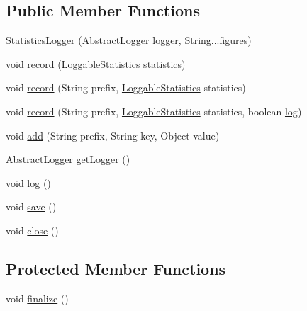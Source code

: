 \subsection*{Public Member Functions}
\begin{DoxyCompactItemize}
\item 
\hyperlink{classjenes_1_1statistics_1_1_statistics_logger_ad4bf879bdfb673a6f82f3536fd5557b8}{Statistics\-Logger} (\hyperlink{classjenes_1_1utils_1_1_abstract_logger}{Abstract\-Logger} \hyperlink{classjenes_1_1statistics_1_1_statistics_logger_a8b3fff50891ab6715773b1e71dbfe30d}{logger}, String...\-figures)
\item 
void \hyperlink{classjenes_1_1statistics_1_1_statistics_logger_a8f7fc89cbbd6c6aad447057cd3eb6dbe}{record} (\hyperlink{classjenes_1_1statistics_1_1_statistics_logger_1_1_loggable_statistics}{Loggable\-Statistics} statistics)
\item 
void \hyperlink{classjenes_1_1statistics_1_1_statistics_logger_a31acd1617a14ed32519fc5487b30fd25}{record} (String prefix, \hyperlink{classjenes_1_1statistics_1_1_statistics_logger_1_1_loggable_statistics}{Loggable\-Statistics} statistics)
\item 
void \hyperlink{classjenes_1_1statistics_1_1_statistics_logger_a1e68400e5e02df74005d654dd52a9b34}{record} (String prefix, \hyperlink{classjenes_1_1statistics_1_1_statistics_logger_1_1_loggable_statistics}{Loggable\-Statistics} statistics, boolean \hyperlink{classjenes_1_1statistics_1_1_statistics_logger_a35539d6c4f5664617185d68c6efdf66a}{log})
\item 
void \hyperlink{classjenes_1_1statistics_1_1_statistics_logger_ac9ee13346b299296f315ad6cf247fdcf}{add} (String prefix, String key, Object value)
\item 
\hyperlink{classjenes_1_1utils_1_1_abstract_logger}{Abstract\-Logger} \hyperlink{classjenes_1_1statistics_1_1_statistics_logger_abd8fdfad668108933aa315c415050d63}{get\-Logger} ()
\item 
void \hyperlink{classjenes_1_1statistics_1_1_statistics_logger_a35539d6c4f5664617185d68c6efdf66a}{log} ()
\item 
void \hyperlink{classjenes_1_1statistics_1_1_statistics_logger_a80cde2facc21c7398050e89131a7321e}{save} ()
\item 
void \hyperlink{classjenes_1_1statistics_1_1_statistics_logger_aae3d375349f86fcd9a7ce450bae3d046}{close} ()
\end{DoxyCompactItemize}
\subsection*{Protected Member Functions}
\begin{DoxyCompactItemize}
\item 
void \hyperlink{classjenes_1_1statistics_1_1_statistics_logger_ac1b95fdfa1e20c87b66d6f36b78d9ed1}{finalize} ()
\end{DoxyCompactItemize}
